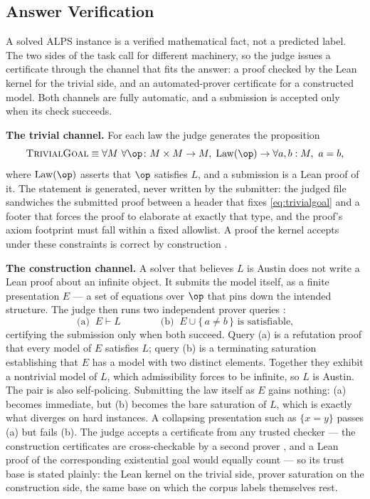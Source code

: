\subsection{Answer Verification}

A solved ALPS instance is a verified mathematical fact, not a predicted label.
The two sides of the task call for different machinery, so the judge issues a
certificate through the channel that fits the answer: a proof checked by the
Lean kernel for the trivial side, and an automated-prover certificate for a
constructed model. Both channels are fully automatic, and a submission is
accepted only when its check succeeds.

\textbf{The trivial channel.} For each law the judge generates the proposition
\begin{equation}
\label{eq:trivialgoal}
\textsc{TrivialGoal} \equiv \forall M\ \forall {\op}\colon M \times M \to M,\;
\mathrm{Law}(\op) \rightarrow \forall a, b : M,\ a = b,
\end{equation}
where $\mathrm{Law}(\op)$ asserts that $\op$ satisfies $L$, and a submission
is a Lean proof of it. The statement is generated, never written by the
submitter: the judged file sandwiches the submitted proof between a header
that fixes \eqref{eq:trivialgoal} and a footer that forces the proof to
elaborate at exactly that type, and the proof's axiom footprint must fall
within a fixed allowlist. A proof the kernel accepts under these constraints
is correct by construction \citep{moura2021lean}.

\textbf{The construction channel.} A solver that believes $L$ is Austin does
not write a Lean proof about an infinite object. It submits the model itself,
as a finite presentation $E$ — a set of equations over $\op$ that pins down
the intended structure. The judge then runs two independent prover queries
\citep{kovacs2013first}:
\begin{equation}
\label{eq:construction}
\text{(a)}\;\; E \vdash L
\qquad\qquad
\text{(b)}\;\; E \cup \{\,a \neq b\,\} \text{ is satisfiable,}
\end{equation}
certifying the submission only when both succeed. Query (a) is a refutation
proof that every model of $E$ satisfies $L$; query (b) is a terminating
saturation establishing that $E$ has a model with two distinct elements.
Together they exhibit a nontrivial model of $L$, which admissibility forces to
be infinite, so $L$ is Austin. The pair is also self-policing. Submitting the
law itself as $E$ gains nothing: (a) becomes immediate, but (b) becomes the
bare saturation of $L$, which is exactly what diverges on hard instances. A
collapsing presentation such as $\{x = y\}$ passes (a) but fails (b). The
judge accepts a certificate from any trusted checker — the construction
certificates are cross-checkable by a second prover
\citep{smallbone2021twee}, and a Lean proof of the corresponding existential
goal would equally count — so its trust base is stated plainly: the Lean
kernel on the trivial side, prover saturation on the construction side, the
same base on which the corpus labels themselves rest.

